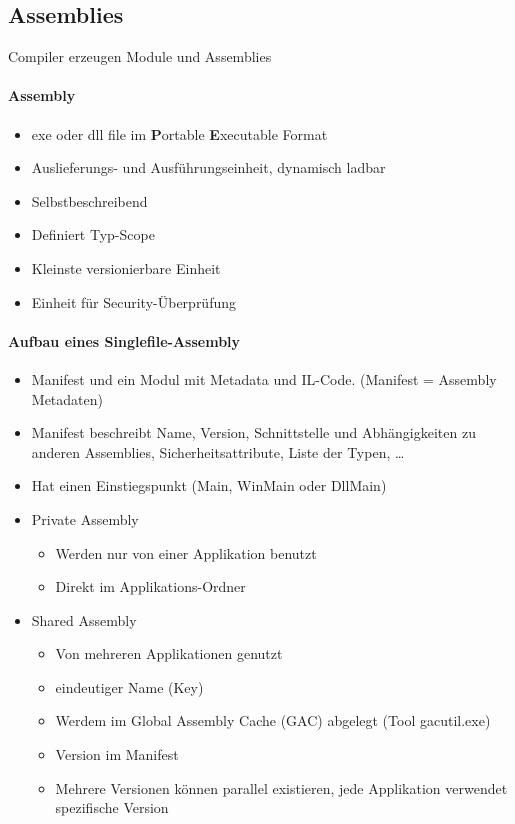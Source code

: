 \subsection{Assemblies}
Compiler erzeugen Module und Assemblies
\paragraph{Assembly}
\begin{itemize}
	\item exe oder dll file im \textbf{P}ortable \textbf{E}xecutable Format
	\item Auslieferungs- und Ausführungseinheit, dynamisch ladbar
	\item Selbstbeschreibend
	\item Definiert Typ-Scope
	\item Kleinste versionierbare Einheit
	\item Einheit für Security-Überprüfung
\end{itemize}
\paragraph{Aufbau eines Singlefile-Assembly}
\begin{itemize}
	\item Manifest und ein Modul mit Metadata und IL-Code. (Manifest = Assembly Metadaten)
	\item Manifest beschreibt Name, Version, Schnittstelle und Abhängigkeiten zu anderen Assemblies, Sicherheitsattribute, Liste der Typen, \dots
	\item Hat einen Einstiegspunkt (Main, WinMain oder DllMain)
	\item Private Assembly
		\begin{itemize}
			\item Werden nur von einer Applikation benutzt
			\item Direkt im Applikations-Ordner
		\end{itemize}
	\item Shared Assembly
		\begin{itemize}
			\item Von mehreren Applikationen genutzt
			\item eindeutiger Name (Key)
			\item Werdem im Global Assembly Cache (GAC) abgelegt (Tool gacutil.exe)
			\item Version im Manifest
			\item Mehrere Versionen können parallel existieren, jede Applikation verwendet spezifische Version
		\end{itemize}
\end{itemize}


